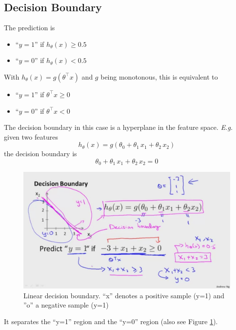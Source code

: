\documentclass[a4paper,twoside,10pt]{article}
\begin{document}
\subsection{Decision Boundary}
The prediction is
\begin{itemize}
  \item ``$y=1$'' if $h_\theta(x)\ge 0.5$
  \item ``$y=0$'' if $h_\theta(x)<0.5$
\end{itemize}
With $h_\theta(x)=g(\theta^\top x)$ and $g$ being monotonous, this is equivalent to
\begin{itemize}
  \item ``$y=1$'' if $\theta^\top x\ge 0$
  \item ``$y=0$'' if $\theta^\top x< 0$
\end{itemize}
The decision boundary in this case is a hyperplane in the feature space. \emph{E.g.} given two features
\begin{equation*}
  h_\theta(x)=g(\theta_0+\theta_1\,x_1+\theta_2\,x_2)
\end{equation*}
the decision boundary is
\begin{equation*}
  \theta_0+\theta_1\,x_1+\theta_2\,x_2=0
\end{equation*}
\begin{figure}[htbp]
  \begin{center}
    \includegraphics[width=.6\textwidth]{decisionboundary}
    \caption[Linear decision boundary]{Linear decision boundary. ``x'' denotes a positive sample (y=1) and ''o'' a negative sample (y=1)\label{fig:decisionboundary}}
  \end{center}
\end{figure}
It separates the ``y=1'' region and the ``y=0'' region (also see Figure \ref{fig:decisionboundary}).
\end{document}
